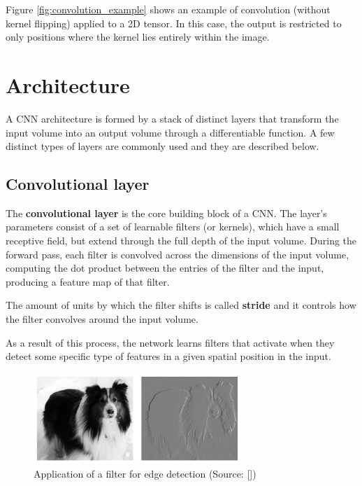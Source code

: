 Figure \ref{fig:convolution_example} shows an example of convolution (without kernel flipping) applied to a 2D tensor. In this case, the output is restricted to only positions where the kernel lies entirely within the image.

\section{Architecture}

A \acs{CNN} architecture is formed by a stack of distinct layers that transform the input volume into an output volume through a differentiable function. A few distinct types of layers are commonly used and they are described below.

\subsection{Convolutional layer}

The \textbf{convolutional layer} is the core building block of a \acs{CNN}. The layer's parameters consist of a set of learnable filters (or kernels), which have a small receptive field, but extend through the full depth of the input volume. During the forward pass, each filter is convolved across the dimensions of the input volume, computing the dot product between the entries of the filter and the input, producing a feature map of that filter.

The amount of units by which the filter shifts is called \textbf{stride} and it controls how the filter convolves around the input volume.

As a result of this process, the network learns filters that activate when they detect some specific type of features in a given spatial position in the input.

\begin{figure}
	\centering
	\includegraphics[width=0.7\textwidth]{Images/filter_application}
	\caption{Application of a filter for edge detection (Source: [\cite{Goodfellow-et-al-2016}])}\label{fig:filter_application}
\end{figure}

